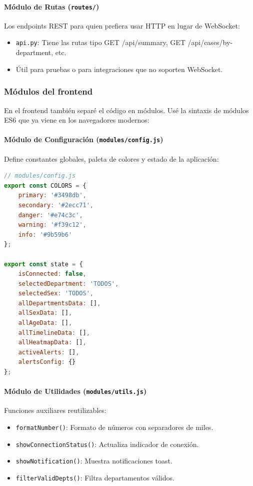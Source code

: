 \documentclass[12pt,a4paper]{article}
\begin{document}
\paragraph{Módulo de Rutas (\texttt{routes/})}
Los endpoints REST para quien prefiera usar HTTP en lugar de WebSocket:
\begin{itemize}
    \item \texttt{api.py}: Tiene las rutas tipo GET /api/summary, GET /api/cases/by-department, etc.
    \item Útil para pruebas o para integraciones que no soporten WebSocket.
\end{itemize}

\subsubsection{Módulos del frontend}

En el frontend también separé el código en módulos. Usé la sintaxis de módulos ES6 que ya viene en los navegadores modernos:

\paragraph{Módulo de Configuración (\texttt{modules/config.js})}
Define constantes globales, paleta de colores y estado de la aplicación:

\begin{lstlisting}[language=JavaScript, caption={Módulo de configuración del frontend}, label={lst:config-module}]
// modules/config.js
export const COLORS = {
    primary: '#3498db',
    secondary: '#2ecc71',
    danger: '#e74c3c',
    warning: '#f39c12',
    info: '#9b59b6'
};

export const state = {
    isConnected: false,
    selectedDepartment: 'TODOS',
    selectedSex: 'TODOS',
    allDepartmentsData: [],
    allSexData: [],
    allAgeData: [],
    allTimelineData: [],
    allHeatmapData: [],
    activeAlerts: [],
    alertsConfig: {}
};
\end{lstlisting}

\paragraph{Módulo de Utilidades (\texttt{modules/utils.js})}
Funciones auxiliares reutilizables:
\begin{itemize}
    \item \texttt{formatNumber()}: Formato de números con separadores de miles.
    \item \texttt{showConnectionStatus()}: Actualiza indicador de conexión.
    \item \texttt{showNotification()}: Muestra notificaciones toast.
    \item \texttt{filterValidDepts()}: Filtra departamentos válidos.
\end{itemize}
\end{document}

